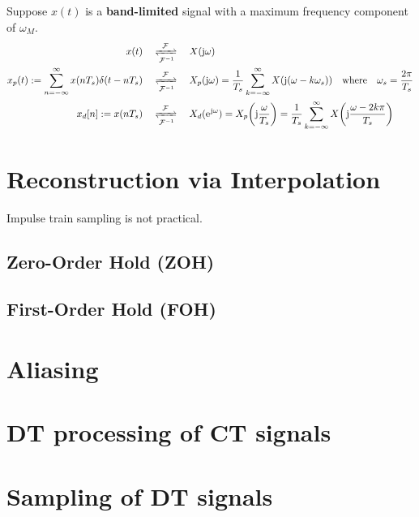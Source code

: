 \documentclass[10pt,UTF8]{article}
\newenvironment{definition box}
{\begin{tcolorbox}[colback=blue!5!white,colframe=blue!75!black,parbox=false,before upper=\par,before lower=\par]}
{\end{tcolorbox}}
\newenvironment{theorem box}
{\begin{tcolorbox}[colback=yellow!5!white,colframe=yellow!75!black,parbox=false,before upper=\par,before lower=\par]}
{\end{tcolorbox}}
\theoremstyle{definition}
\newtheorem{definition inner}{Definition}[section]
\theoremstyle{plain}
\newtheorem{theorem inner}{Theorem}[section]
\theoremstyle{definition}
\newtheorem*{proof inner}{\textit{Proof}}
\theoremstyle{remark}
\newcommand{\ju}{\mathrm{j}}  %
\newcommand{\e}{\mathrm{e}{\mkern 1 mu}}
\begin{document}
\subsection{}
Suppose $x(t)$ is a \textbf{band-limited} signal with
a maximum frequency component of $\omega_M$.
\begin{align*}
    x(t)
    \quad&\xrightleftharpoons[\mathcal{F}^{-1}]{\mathcal{F}}\quad
    X(\ju\omega) \\
    x_p(t) := \sum_{n=-\infty}^{\infty} x(n T_s) \delta(t-n T_s)
    \quad&\xrightleftharpoons[\mathcal{F}^{-1}]{\mathcal{F}}\quad
    X_p(\ju\omega) =
    \frac{1}{T_s} \sum_{k=-\infty}^{\infty} X\qty(\ju\qty(\omega - k \omega_s))
    \qq{where} \omega_s = \frac{2\pi}{T_s} \\
    x_d[n] := x(n T_s)
    \quad&\xrightleftharpoons[\mathcal{F}^{-1}]{\mathcal{F}}\quad
    X_d(\e^{\ju\omega}) = X_p\qty(\ju\frac{\omega}{T_s})
    = \frac{1}{T_s} \sum_{k=-\infty}^{\infty} X\qty(\ju\frac{\omega-2 k\pi}{T_s})
\end{align*}


\section{Reconstruction via Interpolation}
Impulse train sampling is not practical.

\subsection{Zero-Order Hold (ZOH)}

\subsection{First-Order Hold (FOH)}

\section{Aliasing}


\section{DT processing of CT signals}


\section{Sampling of DT signals}
\end{document}
